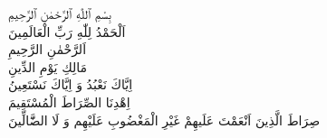 بِسْمِ ٱللّٰهِ ٱلرَّحْمٰنِ ٱلرَّحِيمِ\\
اَلْحَمْدُ لِلّٰهِ رَبِّ الْعَالَمِينَ\\
اَلرَّحْمٰنِ الرَّحِيمِ\\
مَالِكِ يَوْمِ الدِّينِ\\
اِيَّاكَ نَعْبُدُ وَ اِيَّاكَ نَسْتَعِينُ\\
اِهْدِنَا الصِّرَاطَ الْمُسْتَقِيمَ\\
صِرَاطَ الَّذِينَ اَنْعَمْتَ عَلَيهِمْ غَيْرِ الْمَغْضُوبِ عَلَيْهِم وَ لَا الضَّٓالِّينَ\\
